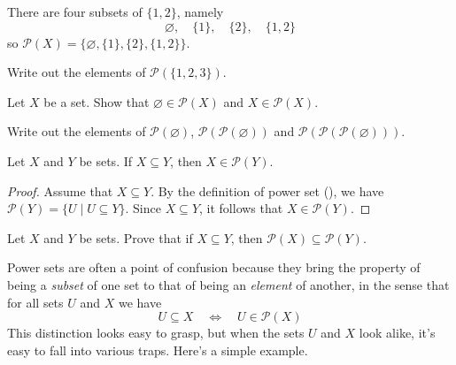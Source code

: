 \begin{example}
There are four subsets of $\{ 1, 2 \}$, namely
\[ \varnothing, \quad \{ 1 \}, \quad \{ 2 \}, \quad \{ 1, 2 \} \]
so $\mathcal{P}(X) = \{\varnothing, \{ 1 \}, \{ 2 \}, \{ 1, 2 \}\}$.
\end{example}

\begin{exercise}
Write out the elements of $\mathcal{P}(\{1, 2, 3\})$.
\end{exercise}

\begin{exercise}
Let $X$ be a set. Show that $\varnothing \in \mathcal{P}(X)$ and $X \in \mathcal{P}(X)$.
\end{exercise}

\begin{exercise}
Write out the elements of $\mathcal{P}(\varnothing)$, $\mathcal{P}(\mathcal{P}(\varnothing))$ and $\mathcal{P}(\mathcal{P}(\mathcal{P}(\varnothing)))$.
\end{exercise}

\begin{example}
\label{exSubsetImpliesPowerSetMembership}
Let $X$ and $Y$ be sets. If $X \subseteq Y$, then $X \in \mathcal{P}(Y)$.

\begin{proof}
Assume that $X \subseteq Y$. By the definition of power set (), we have $\mathcal{P}(Y) = \{U \mid U \subseteq Y\}$. Since $X \subseteq Y$, it follows that $X \in \mathcal{P}(Y)$.
\end{proof}
\end{example}

\begin{exercise}
Let $X$ and $Y$ be sets. Prove that if $X \subseteq Y$, then $\mathcal{P}(X) \subseteq \mathcal{P}(Y)$.
\end{exercise}

Power sets are often a point of confusion because they bring the property of being a \textit{subset} of one set to that of being an \textit{element} of another, in the sense that for all sets $U$ and $X$ we have
\[ U \subseteq X \quad \Leftrightarrow \quad U \in \mathcal{P}(X) \]
This distinction looks easy to grasp, but when the sets $U$ and $X$ look alike, it's easy to fall into various traps. Here's a simple example.

